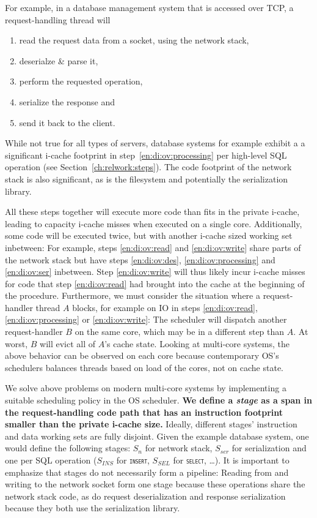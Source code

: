 \documentclass[12pt,a4paper]{book}
\begin{document}
For example, in a database management system that is accessed over TCP, a request-handling thread will
\begin{enumerate}[label=(\alph*)]
    \item read the request data from a socket, using the network stack, \label{en:di:ov:read}
    \item deserialze \& parse it, \label{en:di:ov:des}
    \item perform the requested operation,\label{en:di:ov:processing}
    \item serialize the response and \label{en:di:ov:ser}
    \item send it back to  the client. \label{en:di:ov:write}
\end{enumerate}
While not true for all types of servers, database systems for example exhibit a a significant i-cache footprint in step~\ref{en:di:ov:processing} per high-level SQL operation (see Section~\ref{ch:relwork:steps}).
The code footprint of the network stack is also significant, as is the filesystem and potentially the serialization library.

All these steps together will execute more code than fits in the private i-cache, leading to capacity i-cache misses when executed on a single core.
Additionally, some code will be executed twice, but with another i-cache sized working set inbetween:
For example, steps \ref{en:di:ov:read} and \ref{en:di:ov:write} share parts of the network stack but have steps \ref{en:di:ov:des}, \ref{en:di:ov:processing} and \ref{en:di:ov:ser} inbetween.
Step \ref{en:di:ov:write} will thus likely incur i-cache misses for code that step \ref{en:di:ov:read} had brought into the cache at the beginning of the procedure.
Furthermore, we must consider the situation where a request-handler thread $A$ blocks, for example on IO in steps \ref{en:di:ov:read}, \ref{en:di:ov:processing} or \ref{en:di:ov:write}:
The scheduler will dispatch another request-handler $B$ on the same core, which may be in a different step than $A$.
At worst, $B$ will evict all of $A$'s cache state.
Looking at multi-core systems, the above behavior can be observed on each core because contemporary OS's schedulers balances threads based on load of the cores, not on cache state.

We solve above problems on modern multi-core systems by implementing a suitable scheduling policy in the OS scheduler.
\textbf{We define a \emph{stage} as a span in the request-handling code path that has an instruction footprint smaller than the private i-cache size.}
Ideally, different stages' instruction and data working sets are fully disjoint.
Given the example database system, one would define the following stages:
$S_n$ for network stack, $S_{ser}$ for serialization and one per SQL operation ($S_{INS}$ for \texttt{\textsc{insert}}, $S_{SEL}$ for \texttt{\textsc{select}}, \dots).
It is important to emphasize that stages do not necessarily form a pipeline:
Reading from and writing to the network socket form one stage because these operations share the network stack code, as do request deserialization and response serialization because they both use the serialization library.
\end{document}
